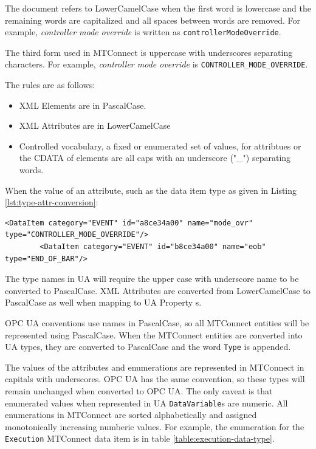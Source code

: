 The document refers to \gls{LowerCamelCase} when the first word is lowercase and the remaining words are capitalized and all spaces between words are removed. For example, \textit{controller mode override} is written as \texttt{controllerModeOverride}.

The third form used in MTConnect is uppercase with underscores separating characters. For example, \textit{controller mode override} is \texttt{CONTROLLER_MODE_OVERRIDE}.

The rules are as follows:
\begin{itemize}
  \item XML Elements are in \gls{PascalCase}.
  \item XML Attributes are in \gls{LowerCamelCase}
  \item Controlled vocabulary, a fixed or enumerated set of values, for attribtues or the CDATA of elements are all caps with an underscore ("\_") separating words. 
\end{itemize}

When the value of an attribute, such as the data item type as given in Listing \ref{lst:type-attr-conversion}:

\begin{lstlisting}[firstnumber=1,%
    caption={\texttt{DataItem} \texttt{type} Attribtue Conversion}, label={lst:type-attr-conversion}]
        <DataItem category="EVENT" id="a8ce34a00" name="mode_ovr" type="CONTROLLER_MODE_OVERRIDE"/>
        <DataItem category="EVENT" id="b8ce34a00" name="eob" type="END_OF_BAR"/>
\end{lstlisting}

The type names in UA will require the upper case with underscore name to be converted to \gls{PascalCase}. XML Attributes are converted from \gls{LowerCamelCase} to \gls{PascalCase} as well when mapping to UA Property s.

OPC UA conventions use names in \gls{PascalCase}, so all MTConnect entities will be represented using \gls{PascalCase}. When the MTConnect entities are converted into UA types, they are converted to \gls{PascalCase} and the word \texttt{Type} is appended. 

The values of the attributes and enumerations are represented in MTConnect in capitals with underscores. OPC UA has the same convention, so these types will remain unchanged when converted to OPC UA. The only caveat is that enumerated values when represented in UA \texttt{DataVariable}s are numeric. All enumerations in MTConnect are sorted alphabetically and assigned monotonically increasing numberic values. For example, the enumeration for the \texttt{Execution} MTConnect data item is in table \ref{table:execution-data-type}.

